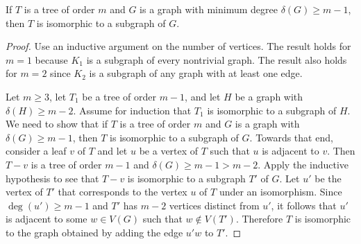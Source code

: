 \begin{theorem}
If $T$ is a tree of order $m$ and $G$ is a graph with
minimum degree $\delta(G) \geq m - 1$, then $T$
is isomorphic to a subgraph of $G$.
\end{theorem}

\begin{proof}
Use an inductive argument on the number of
vertices. The result holds for $m = 1$ because
$K_1$ is a subgraph of every nontrivial graph. The
result also holds for $m = 2$ since $K_2$ is a subgraph of any graph
with at least one edge.

Let $m \geq 3$, let $T_1$ be a tree of order $m - 1$, and let $H$ be a
graph with $\delta(H) \geq m - 2$. Assume for induction that $T_1$ is
isomorphic to a subgraph of $H$. We need to show that if $T$ is a tree
of order $m$ and $G$ is a graph with $\delta(G) \geq m - 1$, then $T$
is isomorphic to a subgraph of $G$. Towards that end, consider a leaf
$v$ of $T$ and let $u$ be a vertex of $T$ such that $u$ is adjacent to
$v$. Then $T - v$ is a tree of order $m - 1$ and
$\delta(G) \geq m - 1 > m - 2$. Apply the inductive hypothesis to see
that $T - v$ is isomorphic to a subgraph $T'$ of $G$. Let $u'$ be the
vertex of $T'$ that corresponds to the vertex $u$ of $T$ under an
isomorphism. Since $\deg(u') \geq m - 1$ and $T'$
has $m - 2$ vertices distinct from $u'$, it follows that $u'$ is
adjacent to some $w \in V(G)$ such that $w \notin V(T')$. Therefore
$T$ is isomorphic to the graph obtained by adding the edge $u'w$ to
$T'$.
\end{proof}

